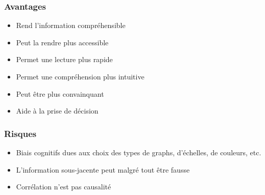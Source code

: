 \begin{frame}\frametitle{Avantages}
   \begin{itemize}
      \item Rend l'information compréhensible
      \item Peut la rendre plus accessible
      \item Permet une lecture plus rapide
      \item Permet une compréhension plus intuitive
      \item Peut être plus convainquant %
      \item Aide à la prise de décision
   \end{itemize}
\end{frame}

\begin{frame}\frametitle{Risques}
   \begin{itemize}
      \item Biais cognitifs dues aux choix des types de graphs, d'échelles, de couleurs, etc.
      \item L'information sous-jacente peut malgré tout être fausse
      \item Corrélation n'est pas causalité
   \end{itemize}
\end{frame}






